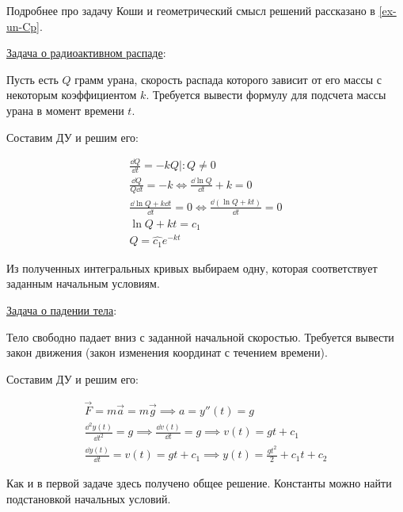 \begin{remark}
  Подробнее про задачу Коши и геометрический смысл решений рассказано в
  \ref{ex-un-Cp}.
\end{remark}

\underline{Задача о радиоактивном распаде}: 

Пусть есть \(Q\) грамм урана, скорость распада которого зависит от его массы с
некоторым коэффициентом \(k\). Требуется вывести формулу для подсчета массы
урана в момент времени \(t\).

Составим ДУ и решим его:

\begin{align*}
  \frac{\dd Q}{\dd t} = -k Q \mid \colon Q \neq 0
  \\
  \frac{\dd Q}{Q \dd t} = -k
  \iff
  \frac{\dd \ln Q}{\dd t} + k = 0
  \\
  \frac{\dd \ln Q + k \dd t}{\dd t} = 0
  \iff
  \frac{\dd (\ln Q + k t)}{\dd t} = 0
  \\
  \ln Q + kt = c_{1} \\
  Q = \widehat{c_{1}} e^{-k t}
\end{align*}

Из полученных интегральных кривых выбираем одну, которая соответствует
заданным начальным условиям.

\underline{Задача о падении тела}: 

Тело свободно падает вниз с заданной начальной скоростью. Требуется вывести
закон движения (закон изменения координат с течением времени).

Составим ДУ и решим его:

\begin{align*}
  \vec{F} = m \vec{a} = m \vec{g} \implies a = y''(t) = g \\
  \frac{\dd^{2} y(t)}{\dd t^{2}} = g
  \implies \frac{\dd v(t)}{\dd t} = g 
  \implies v(t) = g t + c_{1} \\
  \frac{\dd y(t)}{\dd t}  = v(t) = g t + c_{1}
  \implies y(t) = \frac{g t^{2}}{2} + c_{1} t + c_{2}
\end{align*}

Как и в первой задаче здесь получено общее решение. Константы можно найти
подстановкой начальных условий.
